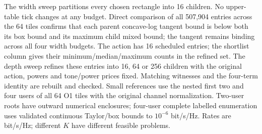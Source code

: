 \begin{table}[htbp]
\begin{minipage}{\linewidth}
The width sweep partitions every chosen rectangle into 16 children. No upper-table tick changes at any budget. Direct comparison of all 507,904 entries across the 64 tiles confirms that each parent concave-log tangent bound is below both its box bound and its maximum child mixed bound; the tangent remains binding across all four width budgets. The action has 16 scheduled entries; the shortlist column gives their minimum/median/maximum counts in the refined set. The depth sweep refines these entries into 16, 64 or 256 children with the original action, powers and tone/power prices fixed. Matching witnesses and the four-term identity are rebuilt and checked. Small references use the nested first two and four users of all 64 O1 tiles with the original channel normalization. Two-user roots have outward numerical enclosures; four-user complete labelled enumeration uses validated continuous Taylor/box bounds to $10^{-6}$ bit/s/Hz. Rates are bit/s/Hz; different $K$ have different feasible problems.
\end{minipage}
\end{table}
